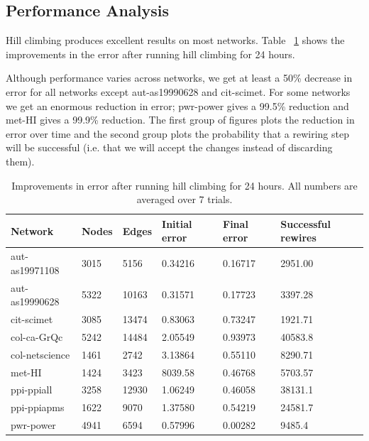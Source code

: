 \subsection{Performance Analysis}

Hill climbing produces excellent results on most networks.  Table ~\ref{table:errors} shows the improvements in the error after running hill climbing for 24 hours.

Although performance varies across networks, we get at least a 50\% decrease in error for all networks except aut-as19990628 and cit-scimet.  For some networks we get an enormous reduction in error; pwr-power gives a 99.5\% reduction and met-HI gives a 99.9\% reduction.  The first group of figures plots the reduction in error over time and the second group plots the probability that a rewiring step will be successful (i.e. that we will accept the changes instead of discarding them).

\begin{table}[t]
\centering
\begin{tabular}{l | l | l | | l | l | l}
\hline
Network & Nodes & Edges & Initial error & Final error & Successful rewires\\ \hline
aut-as19971108 & 3015 & 5156 & 0.34216 & 0.16717 & 2951.00\\\hline
aut-as19990628 & 5322 & 10163 & 0.31571 & 0.17723 & 3397.28\\\hline
cit-scimet & 3085 & 13474 & 0.83063 & 0.73247 & 1921.71\\\hline
col-ca-GrQc & 5242 & 14484 & 2.05549 & 0.93973 & 40583.8\\\hline
col-netscience & 1461 & 2742 & 3.13864 & 0.55110 & 8290.71\\\hline
met-HI & 1424 & 3423 & 8039.58 & 0.46768 & 5703.57\\\hline
ppi-ppiall & 3258 & 12930 & 1.06249 & 0.46058 & 38131.1\\\hline
ppi-ppiapms & 1622 & 9070 & 1.37580 & 0.54219 & 24581.7\\\hline
pwr-power & 4941 & 6594 & 0.57996 & 0.00282 & 9485.4\\\hline
\end{tabular}
\caption{Improvements in error after running hill climbing for 24 hours.  All numbers are averaged over $7$ trials.}
\label{table:errors}
\end{table}

